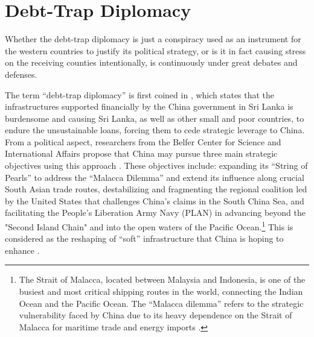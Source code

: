 \section{Debt-Trap Diplomacy}
Whether the debt-trap diplomacy is just a conspiracy used as an instrument for the western countries to justify its political strategy, or is it in fact causing stress on the receiving counties intentionally, is continuously under great debates and defenses.

The term ``debt-trap diplomacy'' is first coined in \citet{Chellaney_2017}, which states that the infrastructures supported financially by the China government in Sri Lanka is burdensome and causing Sri Lanka, as well as other small and poor countries, to endure the unsustainable loans, forcing them to cede strategic leverage to China.
From a political aspect,
researchers from the Belfer Center for Science and International Affairs propose that China may pursue three main strategic objectives using this approach \citep*{Parker2018}.
These objectives include: expanding its ``String of Pearls'' to address the ``Malacca Dilemma'' and extend its influence along crucial South Asian trade routes, destabilizing and fragmenting the regional coalition led by the United States that challenges China's claims in the South China Sea, and facilitating the People's Liberation Army Navy (PLAN) in advancing beyond the "Second Island Chain" and into the open waters of the Pacific Ocean.\footnote{
    The Strait of Malacca, located between Malaysia and Indonesia, is one of the busiest and most critical shipping routes in the world, connecting the Indian Ocean and the Pacific Ocean.
The ``Malacca dilemma'' refers to the strategic vulnerability faced by China due to its heavy dependence on the Strait of Malacca for maritime trade and energy imports \citep*{Parker2018}.}
This is considered as the reshaping of ``soft'' infrastructure that China is hoping to enhance \citep{Jonathan-Hillman-18}.

